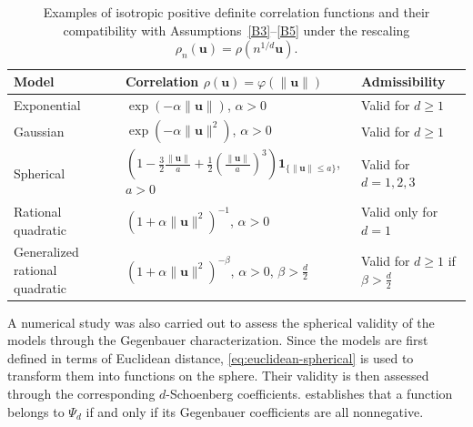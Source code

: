 \documentclass[12pt]{report} %
\newcommand{\bs}{\mathbf{s}}
\newcommand{\bu}{\boldsymbol{u}}
\begin{document}
\begin{table}[htbp]
\centering
\small
\renewcommand{\arraystretch}{1.15}
\begin{tabular}{lll}
\hline
\textbf{Model} & \textbf{Correlation $\rho(\bu)=\varphi(\|\bu\|)$} & \textbf{Admissibility} \\
\hline
Exponential &
$\exp(-\alpha\|\bu\|)$, $\alpha>0$ &
Valid for $d\geq 1$ \\

Gaussian &
$\exp(-\alpha\|\bu\|^2)$, $\alpha>0$ &
Valid for $d\geq 1$ \\
 
Spherical &
$\left(1-\frac{3}{2}\frac{\|\bu\|}{a}
+\frac{1}{2}\left(\frac{\|\bu\|}{a}\right)^3\right)
\mathbf{1}_{\{\|\bu\|\leq a\}}$, $a>0$ &
Valid for $d = 1,2,3$ \\

Rational quadratic &
$(1+\alpha\|\bu\|^2)^{-1}$, $\alpha>0$ &
Valid only for $d=1$ \\

Generalized rational quadratic &
$(1+\alpha\|\bu\|^2)^{-\beta}$, $\alpha>0$, $\beta>\frac d2$ &
Valid for $d\geq 1$ if $\beta>\frac d2$ \\
\hline
\end{tabular}
\caption{Examples of isotropic positive definite correlation functions and their compatibility with Assumptions~\ref{B3}--\ref{B5} under the rescaling $\rho_n(\bu)=\rho(n^{1/d}\bu)$.}
\label{tab:examples-correlations}
\end{table}



A numerical study was also carried out to assess the spherical validity of the models through the Gegenbauer characterization. Since the models are first defined in terms of Euclidean distance, \eqref{eq:euclidean-spherical} is used to transform them into functions on the sphere. Their validity is then assessed through the corresponding $d$-Schoenberg coefficients. \citet[Theorem~1]{Gneiting2013} establishes that a function belongs to $\Psi_d$ if and only if its Gegenbauer coefficients 
are all nonnegative.

\end{document}
